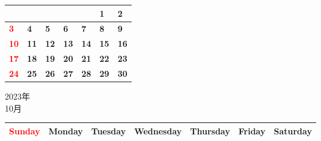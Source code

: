 \documentclass[a4paper,landscape]{jsarticle}
\newcommand{\dig}{\hspace{29mm}}
\newcommand{\tdig}{\hspace{27mm}}
\newcommand{\LBF}{\LARGE\textbf}
\begin{document}
\begingroup
\renewcommand{\arraystretch}{4}
\begin{tabular}{|p{32mm}|p{32mm}|p{32mm}|p{32mm}|p{32mm}|p{32mm}|p{32mm}|}
\hline
&&&&&\raisebox{30pt} {\dig\LBF{1}}&\raisebox{30pt} {\dig\LBF{2}}\\
\hline
\raisebox{30pt} {\dig\textcolor{red}{\LBF{3}}}&\raisebox{30pt} {\dig\LBF{4}}&\raisebox{30pt} {\dig\LBF{5}}&\raisebox{30pt} {\dig\LBF{6}}&\raisebox{30pt} {\dig\LBF{7}}&\raisebox{30pt} {\dig\LBF{8}}&\raisebox{30pt} {\dig\LBF{9}}\\
\hline
\raisebox{30pt} {\tdig\textcolor{red}{\LBF{10}}}&\raisebox{30pt} {\tdig\LBF{11}}&\raisebox{30pt} {\tdig\LBF{12}}&\raisebox{30pt} {\tdig\LBF{13}}&\raisebox{30pt} {\tdig\LBF{14}}&\raisebox{30pt} {\tdig\LBF{15}}&\raisebox{30pt} {\tdig\LBF{16}}\\
\hline
\raisebox{30pt} {\tdig\textcolor{red}{\LBF{17}}}&\raisebox{30pt} {\tdig\LBF{18}}&\raisebox{30pt} {\tdig\LBF{19}}&\raisebox{30pt} {\tdig\LBF{20}}&\raisebox{30pt} {\tdig\LBF{21}}&\raisebox{30pt} {\tdig\LBF{22}}&\raisebox{30pt} {\tdig\LBF{23}}\\
\hline
\raisebox{30pt} {\tdig\textcolor{red}{\LBF{24}}}&\raisebox{30pt} {\tdig\LBF{25}}&\raisebox{30pt} {\tdig\LBF{26}}&\raisebox{30pt} {\tdig\LBF{27}}&\raisebox{30pt} {\tdig\LBF{28}}&\raisebox{30pt} {\tdig\LBF{29}}&\raisebox{30pt} {\tdig\LBF{30}}\\
\hline
\end{tabular}
\endgroup

\newpage

\begin{center}
	\LARGE 2023年\\
	\LARGE 10月
\end{center}

\begingroup
\renewcommand{\arraystretch}{1.4}
\begin{tabular}{|>{\centering\arraybackslash}p{32mm}|>{\centering\arraybackslash}p{32mm}|>{\centering\arraybackslash}p{32mm}|>{\centering\arraybackslash}p{32mm}|>{\centering\arraybackslash}p{32mm}|>{\centering\arraybackslash}p{32mm}|>{\centering\arraybackslash}p{32mm}|}
\hline
\textcolor{red}{\large Sunday}&\large Monday&\large Tuesday&\large Wednesday&\large Thursday&\large Friday&\large Saturday\\
\hline
\end{tabular}
\endgroup
\end{document}
